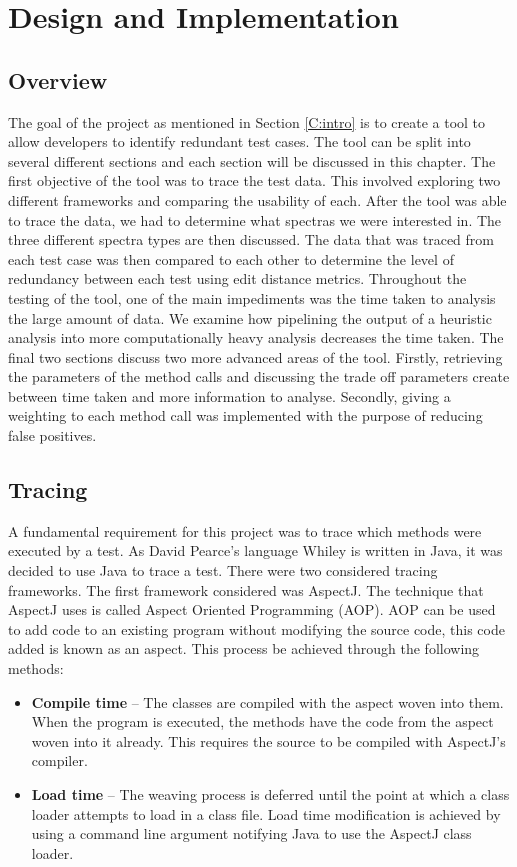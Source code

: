 \chapter{Design and Implementation}\label{C:workdone}

\section{Overview}

The goal of the project as mentioned in Section \ref{C:intro} is to create a tool to allow developers to identify redundant test cases. The tool can be split into several different sections and each section will be discussed in this chapter. The first objective of the tool was to trace the test data. This involved exploring two different frameworks and comparing the usability of each. After the tool was able to trace the data, we had to determine what spectras we were interested in. The three different spectra types are then discussed. The data that was traced from each test case was then compared to each other to determine the level of redundancy between each test using edit distance metrics. Throughout the testing of the tool, one of the main impediments was the time taken to analysis the large amount of data. We examine how pipelining the output of a heuristic analysis into more computationally heavy analysis decreases the time taken. The final two sections discuss two more advanced areas of the tool. Firstly, retrieving the parameters of the method calls and discussing the trade off parameters create between time taken and more information to analyse. Secondly, giving a weighting to each method call was implemented with the purpose of reducing false positives.

\section{Tracing}
\label{S:trace}
A fundamental requirement for this project was to trace which methods were executed by a test. As David Pearce's language Whiley is written in Java, it was decided to use Java to trace a test. There were two considered tracing frameworks. The first framework considered was AspectJ. The technique that AspectJ uses is called Aspect Oriented Programming (AOP). AOP can be used to add code to an existing program without modifying the source code, this code added is known as an aspect. This process be achieved through the following methods:

\begin{itemize}
\item \textbf{Compile time} --
The classes are compiled with the aspect woven into them. When the program is executed, the methods have the code from the aspect woven into it already. This requires the source to be compiled with AspectJ's compiler.
\item \textbf{Load time} --
The weaving process is deferred until the point at which a class loader attempts to load in a class file. Load time modification is achieved by using a command line argument notifying Java to use the AspectJ class loader.
\end{itemize}


